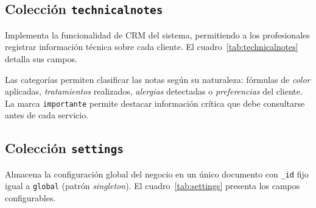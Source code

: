 \subsection{Colecci\'on \texttt{technicalnotes}}\label{subsec:technicalnotes}

Implementa la funcionalidad de CRM del sistema, permitiendo a los profesionales registrar informaci\'on t\'ecnica sobre cada cliente. El cuadro~\ref{tab:technicalnotes} detalla sus campos.


Las categor\'ias permiten clasificar las notas seg\'un su naturaleza: f\'ormulas de \textit{color} aplicadas, \textit{tratamientos} realizados, \textit{alergias} detectadas o \textit{preferencias} del cliente. La marca \texttt{importante} permite destacar informaci\'on cr\'itica que debe consultarse antes de cada servicio.

\subsection{Colecci\'on \texttt{settings}}\label{subsec:settings}

Almacena la configuraci\'on global del negocio en un \'unico documento con \texttt{\_id} fijo igual a \texttt{global} (patr\'on \textit{singleton}). El cuadro~\ref{tab:settings} presenta los campos configurables.

